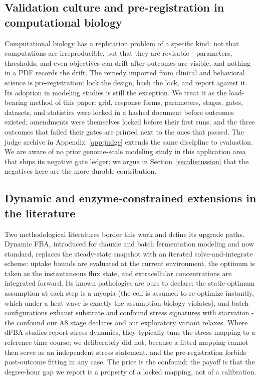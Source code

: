 \documentclass[12pt]{article}
\begin{document}
\subsection{Validation culture and pre-registration in computational biology}

Computational biology has a replication problem of a specific kind:
not that computations are irreproducible, but that they are
revisable - parameters, thresholds, and even objectives can drift
after outcomes are visible, and nothing in a PDF records the drift.
The remedy imported from clinical and behavioral science is
pre-registration: lock the design, hash the lock, and report against
it. Its adoption in modeling studies is still the exception. We treat
it as the load-bearing method of this paper: grid, response forms,
parameters, stages, gates, datasets, and statistics were locked in a
hashed document before outcomes existed; amendments were themselves
locked before their first runs; and the three outcomes that failed
their gates are printed next to the ones that passed. The judge
archive in Appendix~\ref{app:judge} extends the same discipline to
evaluation. We are aware of no prior genome-scale modeling study in
this application area that ships its negative gate ledger; we argue
in Section~\ref{sec:discussion} that the negatives here are the more
durable contribution.



\subsection{Dynamic and enzyme-constrained extensions in the literature}

Two methodological literatures border this work and define its
upgrade paths. Dynamic FBA, introduced for diauxie and batch
fermentation modeling and now standard, replaces the steady-state
snapshot with an iterated solve-and-integrate scheme: uptake bounds
are evaluated at the current environment, the optimum is taken as the
instantaneous flux state, and extracellular concentrations are
integrated forward. Its known pathologies are ours to declare:
the static-optimum assumption at each step is a myopia (the cell is
assumed to re-optimize instantly, which under a heat wave is exactly
the assumption biology violates), and batch configurations exhaust
substrate and confound stress signatures with starvation - the
confound our A8 stage declares and our exploratory variant relaxes.
Where dFBA studies report stress dynamics, they typically tune the
stress mapping to a reference time course; we deliberately did not,
because a fitted mapping cannot then serve as an independent stress
statement, and the pre-registration forbids post-outcome fitting in
any case. The price is the confound; the payoff is that the
degree-hour gap we report is a property of a locked mapping, not of
a calibration.
\end{document}
